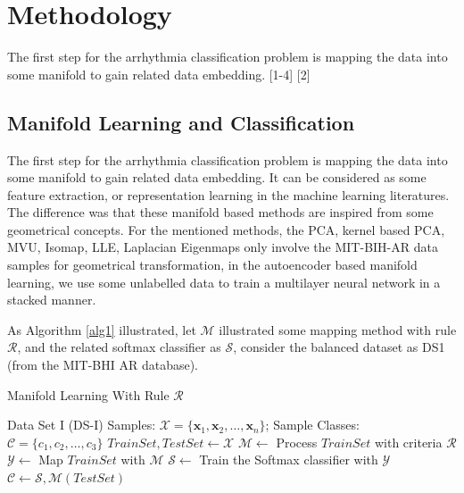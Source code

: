 \documentclass[journal]{IEEEtran}
\begin{document}
%
%


%
%

\section{Methodology}

The first step for the arrhythmia classification problem is mapping the data into some manifold to gain related data embedding. 
[1-4]
[2]
     
\subsection{Manifold Learning and Classification}
The first step for the arrhythmia classification problem is mapping the data into some manifold to gain related data embedding. It can be considered as some feature extraction, or representation learning in the machine learning literatures.
The difference was that these manifold based methods are inspired from some geometrical concepts.
For the mentioned methods, the PCA, kernel based PCA, MVU, Isomap, LLE, Laplacian Eigenmaps only involve the MIT-BIH-AR data samples for geometrical transformation, in the autoencoder based manifold learning, we use some unlabelled data to train a multilayer neural network in a stacked manner.

As Algorithm \ref{alg1} illustrated, let $\mathcal{M}$ illustrated some mapping method with rule $\mathcal{R}$, and the related softmax classifier as $\mathcal{S}$, consider the balanced dataset as DS1 (from the MIT-BHI AR database). 

\begin{algorithm}
 \caption{Manifold Learning With Rule $\mathcal{R}$}
 \label{alg1}
 \begin{algorithmic}
 \REQUIRE Data Set I (DS-I) Samples: $ \mathcal{X} = \{\bm{x}_1, \bm{x}_2, \ldots, \bm{x}_n\}$;
 \ENSURE Sample Classes: $\mathcal{C} = \{c_1, c_2, \ldots, c_3\}$
 \STATE $TrainSet, TestSet \leftarrow \mathcal{X}$
 \STATE $\mathcal{M} \leftarrow $ Process $TrainSet$ with criteria $\mathcal{R}$
 \STATE $\mathcal{Y} \leftarrow$ Map $TrainSet$ with $\mathcal{M}$ 
 \STATE $\mathcal{S} \leftarrow$ Train the Softmax classifier with $\mathcal{Y}$
 \STATE $\mathcal{C} \leftarrow \mathcal{S}, \mathcal{M}(TestSet)$
  \end{algorithmic}
 \end{algorithm}
\end{document}
